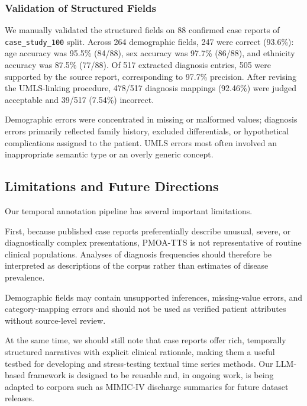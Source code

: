 \documentclass[pdflatex,sn-mathphys-num]{sn-jnl}%
\newif\ifshowrebuttalcolor
\newcommand{\rebuttal}[1]{%
  \ifshowrebuttalcolor
    \textcolor{rebuttalblue}{#1}%
  \else
    #1%
  \fi
}
\theoremstyle{thmstyleone}%
\theoremstyle{thmstyletwo}%
\theoremstyle{thmstylethree}%
\begin{document}
\subsubsection{Validation of Structured Fields}
\label{sec:structured-field-validation}

\rebuttal{
We manually validated the structured fields on 88 confirmed case reports of \texttt{case\_study\_100} split. Across 264 demographic fields, 247 were correct (93.6\%): age accuracy was 95.5\% (84/88), sex accuracy was 97.7\% (86/88), and ethnicity accuracy was 87.5\% (77/88). Of 517 extracted diagnosis entries, 505 were supported by the source report, corresponding to 97.7\% precision. After revising the UMLS-linking procedure, 478/517 diagnosis mappings (92.46\%) were judged acceptable and 39/517 (7.54\%) incorrect.
}

\rebuttal{
Demographic errors were concentrated in missing or malformed values; diagnosis errors primarily reflected family history, excluded differentials, or hypothetical complications assigned to the patient. UMLS errors most often involved an inappropriate semantic type or an overly generic concept.
}


\subsection{Limitations and Future Directions}
\label{sec:limitations-and-future-directions}

Our temporal annotation pipeline has several important limitations. 
\rebuttal{
First, because published case reports preferentially describe unusual, severe, or diagnostically complex presentations, PMOA-TTS is not representative of routine clinical populations. Analyses of diagnosis frequencies should therefore be interpreted as descriptions of the corpus rather than estimates of disease prevalence.
}
\rebuttal{
Demographic fields may contain unsupported inferences, missing-value errors, and category-mapping errors and should not be used as verified patient attributes without source-level review.
}
At the same time, we should still note that case reports offer rich, temporally structured narratives with explicit clinical rationale, making them a useful testbed for developing and stress-testing textual time series methods. Our LLM-based framework is designed to be reusable and, in ongoing work, is being adapted to corpora such as MIMIC-IV discharge summaries for future dataset releases.
\end{document}
